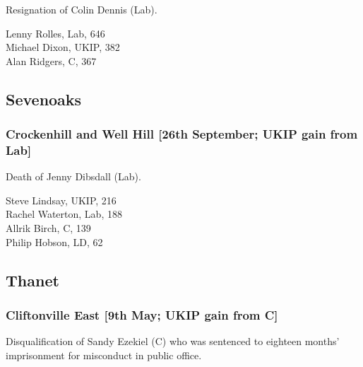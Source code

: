 \documentclass[a4paper,openany,10pt]{book}
\begin{document}

Resignation of Colin Dennis (Lab).



Lenny Rolles, Lab, 646\\
Michael Dixon, UKIP, 382\\
Alan Ridgers, C, 367\\


\subsection*{Sevenoaks}

\subsubsection*{Crockenhill and Well Hill \hspace*{\fill}\nolinebreak[1]%
\enspace\hspace*{\fill}
[26th September; UKIP gain from Lab]}


Death of Jenny Dibsdall (Lab).



Steve Lindsay, UKIP, 216\\
Rachel Waterton, Lab, 188\\
Allrik Birch, C, 139\\
Philip Hobson, LD, 62\\


\subsection*{Thanet}

\subsubsection*{Cliftonville East \hspace*{\fill}\nolinebreak[1]%
\enspace\hspace*{\fill}
[9th May; UKIP gain from C]}


Disqualification of Sandy Ezekiel (C) who was sentenced to eighteen months' imprisonment for misconduct in public office.
\end{document}
